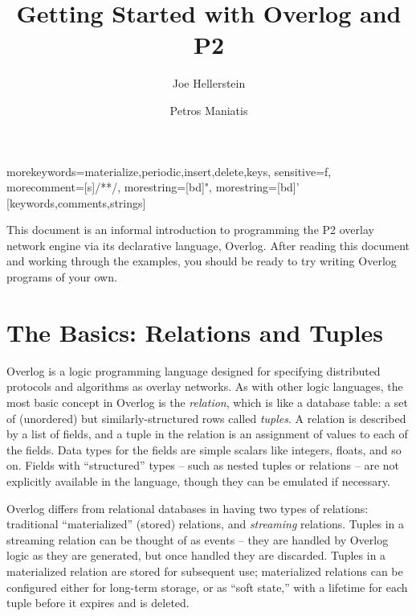 \documentclass{article}
\title{Getting Started with Overlog and P2}
\author{Joe Hellerstein \and Petros Maniatis}
\begin{document}
\date{}
\maketitle

%
  {morekeywords={materialize,periodic,insert,delete,keys},%
   sensitive=f,%
   morecomment=[s]{/*}{*/},%
   morestring=[bd]",%
   morestring=[bd]'%
  }[keywords,comments,strings]%


	
This document is an informal introduction to programming the P2
overlay network engine via its declarative language, Overlog.  After
reading this document and working through the examples, you should
be ready to try writing Overlog programs of your own.

\section{The Basics: Relations and Tuples}
Overlog is a logic programming language designed for specifying
distributed protocols and algorithms as overlay networks.  As with
other logic languages, the most basic concept in Overlog is the {\em
  relation}, which is like a database table: a set of
(unordered) but similarly-structured rows called {\em tuples}.  A
relation is described by a list of fields, and a tuple in the
relation is an assignment of values to each of the fields.  Data types
for the fields are simple scalars like integers, floats, and so
on. Fields with ``structured'' types -- such as
nested tuples or relations -- are not explicitly available in the
language, though they can be emulated if necessary.

Overlog differs from relational databases in having two types of
relations: traditional ``materialized'' (stored) relations, and
{\em streaming} relations.  Tuples in a streaming relation can be thought of
as events -- they are handled by Overlog logic as they are generated,
but once handled they are discarded.  Tuples in a materialized
relation are stored for subsequent use; materialized relations can be
configured either for long-term storage, or as ``soft state,'' with a
lifetime for each tuple before it expires and is deleted.
\end{document}
